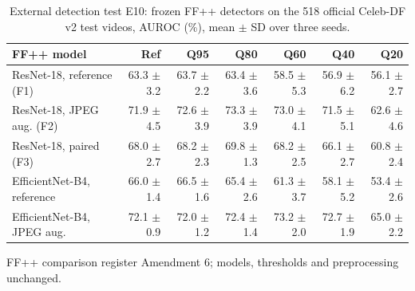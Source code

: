 \begin{table}[t]
\centering
\footnotesize
\caption{External detection test E10: frozen FF++ detectors on the 518 official Celeb-DF v2 test videos, AUROC (\%), mean $\pm$ SD over three seeds.}
\label{tab:e10}
\setlength{\tabcolsep}{3.5pt}
\begin{tabular}{lrrrrrr}
\toprule
FF++ model & Ref & Q95 & Q80 & Q60 & Q40 & Q20 \\
\midrule
ResNet-18, reference (F1) & 63.3 $\pm$ 3.2 & 63.7 $\pm$ 2.2 & 63.4 $\pm$ 3.6 & 58.5 $\pm$ 5.3 & 56.9 $\pm$ 6.2 & 56.1 $\pm$ 2.7 \\
ResNet-18, JPEG aug. (F2) & 71.9 $\pm$ 4.5 & 72.6 $\pm$ 3.9 & 73.3 $\pm$ 3.9 & 73.0 $\pm$ 4.1 & 71.5 $\pm$ 5.1 & 62.6 $\pm$ 4.6 \\
ResNet-18, paired (F3) & 68.0 $\pm$ 2.7 & 68.2 $\pm$ 2.3 & 69.8 $\pm$ 1.3 & 68.2 $\pm$ 2.5 & 66.1 $\pm$ 2.7 & 60.8 $\pm$ 2.4 \\
EfficientNet-B4, reference & 66.0 $\pm$ 1.4 & 66.5 $\pm$ 1.6 & 65.4 $\pm$ 2.6 & 61.3 $\pm$ 3.7 & 58.1 $\pm$ 5.2 & 53.4 $\pm$ 2.6 \\
EfficientNet-B4, JPEG aug. & 72.1 $\pm$ 0.9 & 72.0 $\pm$ 1.2 & 72.4 $\pm$ 1.4 & 73.2 $\pm$ 2.0 & 72.7 $\pm$ 1.9 & 65.0 $\pm$ 2.2 \\
\bottomrule
\end{tabular}
\par\smallskip\parbox{\linewidth}{\scriptsize FF++ comparison register Amendment 6; models, thresholds and preprocessing unchanged.}
\end{table}
